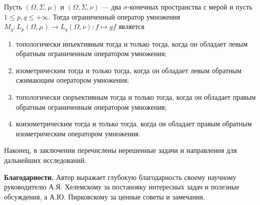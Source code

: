 \begin{theorem*}[\ref{TopInjMultOpDescBtwnTwoMeasSp},
~\ref{IsomMultOpDescBtwnTwoMeasSp},~\ref{TopSurMultOpCharacBtwnTwoMeasSp},
~\ref{CoisomMultOpDescBtwnTwoMeasSp}] Пусть $(\Omega,\Sigma,\mu)$ и
$(\Omega,\Sigma,\nu)$ --- два $\sigma$-конечных пространства с мерой и пусть
$1\leq p, q\leq+\infty$. Тогда ограниченный оператор умножения
$M_g:L_p(\Omega,\mu)\to L_q(\Omega,\nu):f\mapsto gf$ является
\begin{enumerate}[label = (\roman*)]
    \item топологически инъективным тогда и только тогда, когда он обладает
    левым обратным ограниченным оператором умножения;

    \item изометрическим тогда и только тогда, когда он обладает левым обратным
    сжимающим оператором умножения;

    \item топологически сюръективным тогда и только тогда, когда он обладает
    правым обратным ограниченным оператором умножения;

    \item коизометрическим тогда и только тогда, когда он обладает правым
    обратным изометрическим оператором умножения.
\end{enumerate}
\end{theorem*}

Наконец, в заключении перечислены нерешенные задачи и направления для дальнейших
исследований.

\textbf{Благодарности.} Автор выражает глубокую благодарность своему научному
руководителю А.Я. Хелемскому за постановку интересных задач и полезные
обсуждения, а А.Ю. Пирковскому за ценные советы и замечания.
\clearpage